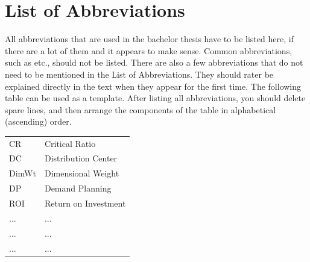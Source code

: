 \documentclass[a4paper,12pt, titlepage]{article}
\begin{document}
\listoffigures{}
\newpage{}

\listoftables{}
\newpage{}

\section*{List of Abbreviations}
All abbreviations that are used in the bachelor thesis have to be listed here, if there are a lot of them and it appears to make sense. Common abbreviations, such as etc., should not be listed. There are also a few abbreviations that do not need to be mentioned in the List of Abbreviations. They should rater be explained directly in the text when they appear for the first time.
The following table can be used as a template. After listing all abbreviations, you should delete spare lines, and then arrange the components of the table in alphabetical (ascending) order.


\begin{table}[h]
 {\def\arraystretch{2}\tabcolsep=10pt
    \begin{tabular}{ll}
      CR      &  Critical Ratio \\
      DC      &  Distribution Center \\
      DimWt   &  Dimensional Weight \\
      DP      &  Demand Planning \\
      ROI     &  Return on Investment \\
      ...     &  ... \\
      ...     &  ... \\
      ...     &  ... \\
    \end{tabular}
    }
\end{table}
	
\end{document}
